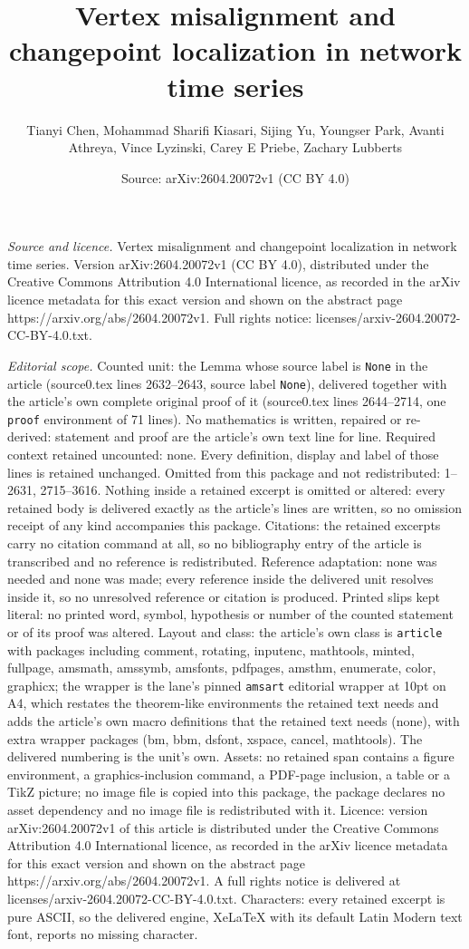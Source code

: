 \documentclass[10pt,a4paper]{amsart}
\title[Vertex misalignment and changepoint localization in network ]{Vertex misalignment and changepoint localization in network time series}
\author{Tianyi Chen, Mohammad Sharifi Kiasari, Sijing Yu, Youngser Park, Avanti Athreya, Vince Lyzinski, Carey E Priebe, Zachary Lubberts}
\date{Source: arXiv:2604.20072v1 (CC BY 4.0)}
\begin{document}
\maketitle

\noindent\emph{Source and licence.} Vertex misalignment and changepoint localization in network time series. Version arXiv:2604.20072v1 (CC BY 4.0), distributed under the Creative Commons Attribution 4.0 International licence, as recorded in the arXiv licence metadata for this exact version and shown on the abstract page https://arxiv.org/abs/2604.20072v1. Full rights notice: licenses/arxiv-2604.20072-CC-BY-4.0.txt.\par\smallskip

\noindent\textit{Editorial scope.} Counted unit: the Lemma whose source label is \texttt{None} in the article (source0.tex lines 2632--2643, source label \texttt{None}), delivered together with the article's own complete original proof of it (source0.tex lines 2644--2714, one \texttt{proof} environment of 71 lines). No mathematics is written, repaired or re-derived: statement and proof are the article's own text line for line. Required context retained uncounted: none. Every definition, display and label of those lines is retained unchanged. Omitted from this package and not redistributed: 1--2631, 2715--3616. Nothing inside a retained excerpt is omitted or altered: every retained body is delivered exactly as the article's lines are written, so no omission receipt of any kind accompanies this package. Citations: the retained excerpts carry no citation command at all, so no bibliography entry of the article is transcribed and no reference is redistributed. Reference adaptation: none was needed and none was made; every reference inside the delivered unit resolves inside it, so no unresolved reference or citation is produced. Printed slips kept literal: no printed word, symbol, hypothesis or number of the counted statement or of its proof was altered. Layout and class: the article's own class is \texttt{article} with packages including comment, rotating, inputenc, mathtools, minted, fullpage, amsmath, amssymb, amsfonts, pdfpages, amsthm, enumerate, color, graphicx; the wrapper is the lane's pinned \texttt{amsart} editorial wrapper at 10pt on A4, which restates the theorem-like environments the retained text needs and adds the article's own macro definitions that the retained text needs (none), with extra wrapper packages (bm, bbm, dsfont, xspace, cancel, mathtools). The delivered numbering is the unit's own. Assets: no retained span contains a figure environment, a graphics-inclusion command, a PDF-page inclusion, a table or a TikZ picture; no image file is copied into this package, the package declares no asset dependency and no image file is redistributed with it. Licence: version arXiv:2604.20072v1 of this article is distributed under the Creative Commons Attribution 4.0 International licence, as recorded in the arXiv licence metadata for this exact version and shown on the abstract page https://arxiv.org/abs/2604.20072v1. A full rights notice is delivered at licenses/arxiv-2604.20072-CC-BY-4.0.txt. Characters: every retained excerpt is pure ASCII, so the delivered engine, XeLaTeX with its default Latin Modern text font, reports no missing character.
\end{document}
